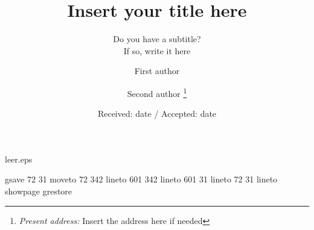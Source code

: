 %
%
%
%
\begin{filecontents}{leer.eps}

gsave
72 31 moveto
72 342 lineto
601 342 lineto
601 31 lineto
72 31 lineto
showpage
grestore
\end{filecontents}
%
\documentclass[cmp,referee]{svjour}
%
\usepackage{graphics}
%

%
\title{Insert your title here}
\subtitle{Do you have a subtitle?\\ If so, write it here}
\author{First author \and Second author%
\thanks{\emph{Present address:} Insert the address here if needed}%
}                     %
%
%
\date{Received: date / Accepted: date}
%
%
\maketitle
%
\begin{abstract}
Insert your abstract here.
\end{abstract}
%
\section{Introduction}
\label{intro}
Your text comes here. Separate text sections with
\section{Section title}
\label{sec:1}
and \cite{RefJ}
